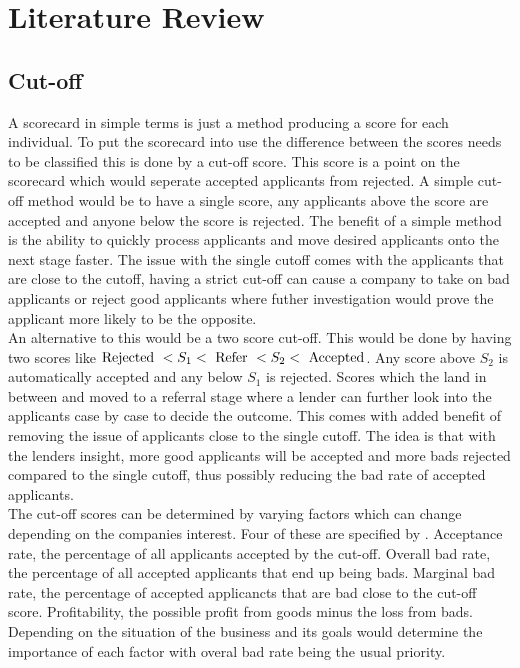 \chapter{Literature Review}

\section{Cut-off}

A scorecard in simple terms is just a method producing a score for each individual. To put the scorecard into use the difference between the scores needs to be classified this is done by a cut-off score. This score is a point on the scorecard which would seperate accepted applicants from rejected. A simple cut-off method would be to have a single score, any applicants above the score are accepted and anyone below the score is rejected. The benefit of a simple method is the ability to quickly process applicants and move desired applicants onto the next stage faster. The issue with the single cutoff comes with the applicants that are close to the cutoff, having a strict cut-off can cause a company to take on bad applicants or reject good applicants where futher investigation would prove the applicant more likely to be the opposite. \\

An alternative to this would be a two score cut-off. This would be done by having two scores like $ \textup{Rejected } < S_{1} < \textup{ Refer } < S_{2} < \textup{ Accepted}$. Any score above $S_{2}$ is automatically accepted and any below $S_{1}$ is rejected. Scores which the land in between and moved to a referral stage where a lender can further look into the applicants case by case to decide the outcome. This comes with added benefit of removing the issue of applicants close to the single cutoff. The idea is that with the lenders insight, more good applicants will be accepted and more bads rejected compared to the single cutoff, thus possibly reducing the bad rate of accepted applicants. \\

The cut-off scores can be determined by varying factors which can change depending on the companies interest. Four of these are specified by \parencite{bailey2004credit}. Acceptance rate, the percentage of all applicants accepted by the cut-off. Overall bad rate, the percentage of all accepted applicants that end up being bads. Marginal bad rate, the percentage of accepted applicancts that are bad close to the cut-off score. Profitability, the possible profit from goods minus the loss from bads. Depending on the situation of the business and its goals would determine the importance of each factor with overal bad rate being the usual priority.

